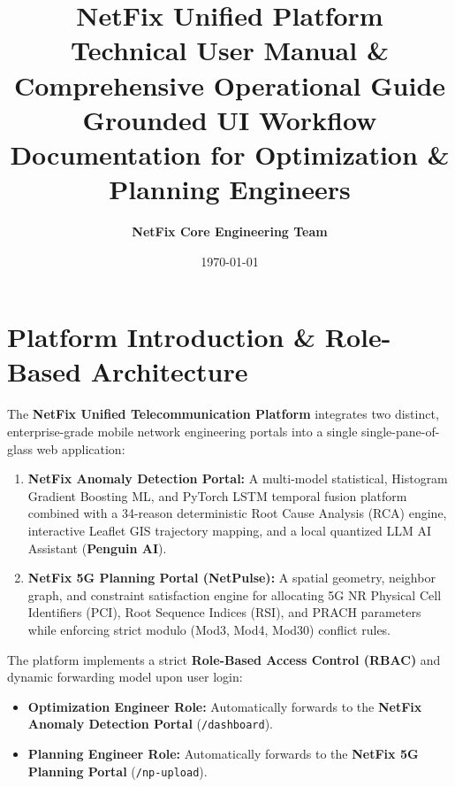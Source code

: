 \documentclass[12pt,a4paper]{article}
\begin{document}
\title{\textbf{\Huge NetFix Unified Platform}\\
\Large Technical User Manual \& Comprehensive Operational Guide\\
\large Grounded UI Workflow Documentation for Optimization \& Planning Engineers}
\author{\textbf{NetFix Core Engineering Team}}
\date{\today}

\maketitle
\tableofcontents
\newpage

\section{Platform Introduction \& Role-Based Architecture}
The \textbf{NetFix Unified Telecommunication Platform} integrates two distinct, enterprise-grade mobile network engineering portals into a single single-pane-of-glass web application:
\begin{enumerate}
    \item \textbf{NetFix Anomaly Detection Portal:} A multi-model statistical, Histogram Gradient Boosting ML, and PyTorch LSTM temporal fusion platform combined with a 34-reason deterministic Root Cause Analysis (RCA) engine, interactive Leaflet GIS trajectory mapping, and a local quantized LLM AI Assistant (\textbf{Penguin AI}).
    \item \textbf{NetFix 5G Planning Portal (NetPulse):} A spatial geometry, neighbor graph, and constraint satisfaction engine for allocating 5G NR Physical Cell Identifiers (PCI), Root Sequence Indices (RSI), and PRACH parameters while enforcing strict modulo (Mod3, Mod4, Mod30) conflict rules.
\end{enumerate}

The platform implements a strict \textbf{Role-Based Access Control (RBAC)} and dynamic forwarding model upon user login:
\begin{itemize}
    \item \textbf{Optimization Engineer Role:} Automatically forwards to the \textbf{NetFix Anomaly Detection Portal} (\texttt{/dashboard}).
    \item \textbf{Planning Engineer Role:} Automatically forwards to the \textbf{NetFix 5G Planning Portal} (\texttt{/np-upload}).
\end{itemize}
\end{document}
